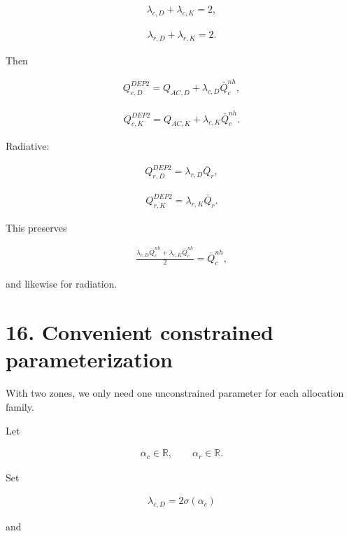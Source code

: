 \documentclass[11pt]{article}
\begin{document}
\begin{align}
\boxed{
\lambda_{c,D}+\lambda_{c,K}=2,
}
\tag{48}
\end{align}

\begin{align}
\boxed{
\lambda_{r,D}+\lambda_{r,K}=2.
}
\tag{49}
\end{align}

Then

\begin{align}
\boxed{
Q_{c,D}^{DEP2}
=
Q_{AC,D}
+
\lambda_{c,D}\bar Q_c^{nh},
}
\tag{50}
\end{align}

\begin{align}
\boxed{
Q_{c,K}^{DEP2}
=
Q_{AC,K}
+
\lambda_{c,K}\bar Q_c^{nh}.
}
\tag{51}
\end{align}

Radiative:

\begin{align}
\boxed{
Q_{r,D}^{DEP2}
=
\lambda_{r,D}\bar Q_r,
}
\tag{52}
\end{align}

\begin{align}
\boxed{
Q_{r,K}^{DEP2}
=
\lambda_{r,K}\bar Q_r.
}
\tag{53}
\end{align}

This preserves

\begin{align}
\frac{
\lambda_{c,D}\bar Q_c^{nh}
+
\lambda_{c,K}\bar Q_c^{nh}
}{2}
=
\bar Q_c^{nh},
\end{align}

and likewise for radiation.

\section*{16. Convenient constrained parameterization}

With two zones, we only need one unconstrained parameter for each allocation family.

Let

\begin{align}
\alpha_c\in\mathbb R,
\qquad
\alpha_r\in\mathbb R.
\end{align}

Set

\begin{align}
\boxed{
\lambda_{c,D}=2\sigma(\alpha_c)
}
\tag{54}
\end{align}

and
\end{document}
